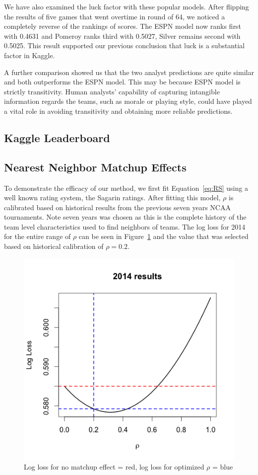 We have also examined the luck factor with these popular models. After flipping the results of five games that went overtime in round of 64, we noticed a completely reverse of the rankings of scores. The ESPN model now ranks first with 0.4631 and Pomeroy ranks third with 0.5027, Silver remains second with 0.5025. This result supported our previous conclusion that luck is a substantial factor in Kaggle. 

A further comparison showed us that the two analyst predictions are quite similar and both outperforms the ESPN model. This may be because ESPN model is strictly transitivity. Human analysts' capability of capturing intangible information regards the teams, such as  morale or playing style, could have played a vital role in avoiding transitivity and obtaining more reliable predictions. 

\subsection{Kaggle Leaderboard}
\subsection{Nearest Neighbor Matchup Effects}
To demonstrate the efficacy of our method, we first fit Equation~\ref{eq:RS} using a well known rating system, the Sagarin ratings. After fitting this model, $\rho$ is calibrated based on historical results from the previous seven years NCAA tournaments. Note seven years was chosen as this is the complete history of the team level characteristics used to find neighbors of teams. The log loss for 2014 for the entire range of $\rho$ can be seen in Figure~\ref{fig:result} and the value that was selected based on historical calibration of $\rho =0.2$.
\begin{figure}[h!]
\centering
\includegraphics[width=.7\textwidth]{results_2014.png}
\caption{Log loss for no matchup effect = red, log loss for optimized $\rho$ = blue}
\label{fig:result}
\end{figure} 
  

